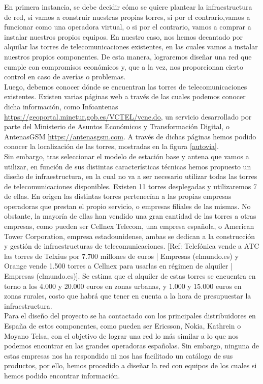 En primera instancia, se debe decidir cómo se quiere plantear la infraestructura de red, si vamos a construir nuestras propias torres, si por el contrario,vamos a funcionar como una operadora virtual, o si por el contrario, vamos a comprar a instalar nuestros propios equipos. En nuestro caso, nos hemos decantado por alquilar las torres de telecomunicaciones existentes, en las cuales vamos a instalar nuestros propios componentes. De esta manera, lograremos diseñar una red que cumple con compromisos económicos y, que a la vez, nos proporcionan cierto control en caso de averías o problemas.\\

Luego, debemos conocer dónde se encuentran las torres de telecomunicaciones existentes. Existen varias páginas web a través de las cuales podemos conocer dicha información, como Infoantenas \url{https://geoportal.minetur.gob.es/VCTEL/vcne.do}, un servicio desarrollado por parte del Ministerio de Asuntos Económicos y Transformación Digital, o AntenasGSM \url{https://antenasgsm.com}. A través de dichas páginas hemos podido conocer la localización de las torres, mostradas en la figura \ref{autovia}.\\

Sin embargo, tras seleccionar el modelo de estación base y antena que vamos a utilizar, en función de sus distintas características técnicas hemos propuesto un diseño de infraestructura, en la cual no va a ser necesario utilizar todas las torres de telecomunicaciones disponibles. Existen 11 torres desplegadas y utilizaremos 7 de ellas. En origen las distintas torres pertenecían a las propias empresas operadoras que prestan el propio servicio, o empresas filiales de las mismas. No obstante, la mayoría de ellas han vendido una gran cantidad de las torres a otras empresas, como pueden ser Cellnex Telecom, una empresa española, o American Tower Corporation, empresa estadounidense, ambas se dedican a la construcción y gestión de infraestructuras de telecomunicaciones. [Ref: Telefónica vende a ATC las torres de Telxius por 7.700 millones de euros | Empresas (elmundo.es) y Orange vende 1.500 torres a Cellnex para usarlas en régimen de alquiler | Empresas (elmundo.es)]. Se estima que el alquiler de estas torres se encuentra en torno a los 4.000 y 20.000 euros en zonas urbanas, y 1.000 y 15.000 euros en zonas rurales, costo que habrá que tener en cuenta a la hora de presupuestar la infraestructura.\\

Para el diseño del proyecto se ha contactado con los principales distribuidores en España de estos componentes, como pueden ser Ericsson, Nokia, Kathrein o Moyano Telsa, con el objetivo de lograr una red lo más similar a lo que nos podemos encontrar en las grandes operadoras españolas. Sin embargo, ninguna de estas empresas nos ha respondido ni nos has facilitado un catálogo de sus productos, por ello, hemos procedido a diseñar la red con equipos de los cuales si hemos podido encontrar información. \\


